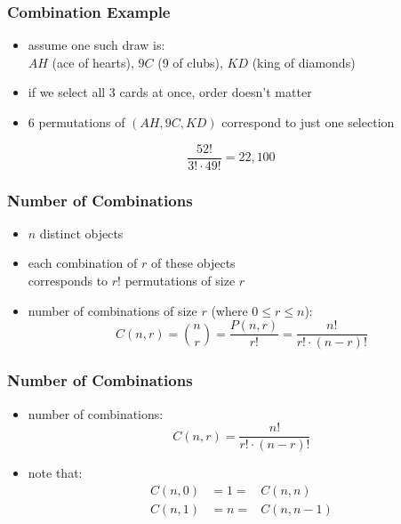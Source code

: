 \documentclass[dvipsnames]{beamer}
\begin{document}
\begin{frame}
  \frametitle{Combination Example}

  \begin{itemize}
    \item assume one such draw is:\\
      $AH$ (ace of hearts), $9C$ (9 of clubs), $KD$ (king of diamonds)
    \item if we select all 3 cards at once, order doesn't matter

    \pause
    \item 6 permutations of $(AH,9C,KD)$ correspond to just one selection
  \end{itemize}
  \begin{equation*}
    \frac{52!}{3! \cdot 49!} = 22,100
  \end{equation*}
\end{frame}

\begin{frame}
  \frametitle{Number of Combinations}

  \begin{itemize}
    \item $n$ distinct objects
    \item each combination of $r$ of these objects\\
      corresponds to $r!$ permutations of size $r$

    \pause
    \medskip
    \item number of combinations of size $r$ (where $0 \leq r \leq n$):
    \begin{equation*}
      C(n,r) = {n \choose r} = \frac{P(n,r)}{r!} = \frac{n!}{r! \cdot (n-r)!}
    \end{equation*}
  \end{itemize}
\end{frame}

\begin{frame}
  \frametitle{Number of Combinations}

  \begin{itemize}
    \item number of combinations:
    \begin{equation*}
      C(n,r) = \frac{n!}{r! \cdot (n-r)!}
    \end{equation*}

    \item note that:
    \begin{eqnarray*}
      C(n,0) & = 1 = & C(n,n)\\
      C(n,1) & = n = & C(n,n-1)
    \end{eqnarray*}
  \end{itemize}
\end{frame}
\end{document}
